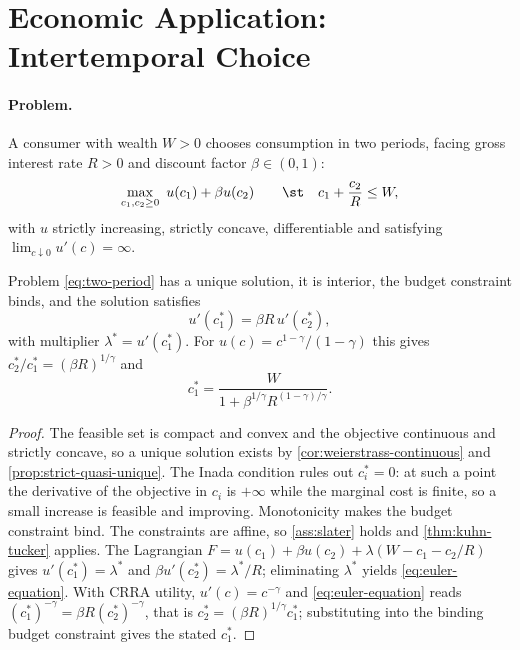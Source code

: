 \section{Economic Application: Intertemporal Choice}\label{sec:opt-intertemporal}

\paragraph{Problem.} A consumer with wealth $W>0$ chooses consumption in two
periods, facing gross interest rate $R>0$ and discount factor $\beta\in(0,1)$:
\begin{equation}\label{eq:two-period}
	\max_{c_1,c_2\geq0}\ u(c_1)+\beta u(c_2)
	\qquad\st\quad c_1+\frac{c_2}{R}\leq W,
\end{equation}
with $u$ strictly increasing, strictly concave, differentiable and satisfying
$\lim_{c\downarrow0}u'(c)=\infty$.

\begin{proposition}\label{prop:euler-two-period}
	Problem \eqref{eq:two-period} has a unique solution, it is interior, the budget
	constraint binds, and the solution satisfies
	\begin{equation}\label{eq:euler-equation}
		u'(c_1^\ast)=\beta R\,u'(c_2^\ast),
	\end{equation}
	with multiplier $\lambda^\ast=u'(c_1^\ast)$. For
	$u(c)=c^{1-\gamma}/(1-\gamma)$ this gives
	$c_2^\ast/c_1^\ast=(\beta R)^{1/\gamma}$ and
	\[
		c_1^\ast=\frac{W}{1+\beta^{1/\gamma}R^{(1-\gamma)/\gamma}} .
	\]
\end{proposition}

\begin{proof}
	The feasible set is compact and convex and the objective continuous and strictly
	concave, so a unique solution exists by
	\autoref{cor:weierstrass-continuous} and \autoref{prop:strict-quasi-unique}. The
	Inada condition rules out $c_i^\ast=0$: at such a point the derivative of the
	objective in $c_i$ is $+\infty$ while the marginal cost is finite, so a small
	increase is feasible and improving. Monotonicity makes the budget constraint
	bind. The constraints are affine, so \autoref{ass:slater} holds and
	\autoref{thm:kuhn-tucker} applies. The Lagrangian
	$F=u(c_1)+\beta u(c_2)+\lambda(W-c_1-c_2/R)$ gives
	$u'(c_1^\ast)=\lambda^\ast$ and $\beta u'(c_2^\ast)=\lambda^\ast/R$;
	eliminating $\lambda^\ast$ yields \eqref{eq:euler-equation}. With CRRA utility,
	$u'(c)=c^{-\gamma}$ and \eqref{eq:euler-equation} reads
	$(c_1^\ast)^{-\gamma}=\beta R(c_2^\ast)^{-\gamma}$, that is
	$c_2^\ast=(\beta R)^{1/\gamma}c_1^\ast$; substituting into the binding budget
	constraint gives the stated $c_1^\ast$.
\end{proof}

